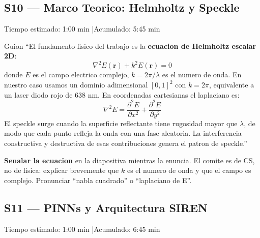 \vspace{8pt}

\subsection{S10 --- Marco Teorico: Helmholtz y Speckle}

\begin{timebox}
Tiempo estimado: 1:00 min \quad|\quad Acumulado: 5:45 min
\end{timebox}
\vspace{4pt}

\begin{slidebox}{Guion}
``El fundamento fisico del trabajo es la \textbf{ecuacion de Helmholtz escalar 2D}:
\[
  \nabla^2 E(\mathbf{r}) + k^2 E(\mathbf{r}) = 0
\]
donde $E$ es el campo electrico complejo, $k = 2\pi/\lambda$ es el numero de onda.
En nuestro caso usamos un dominio adimensional $[0,1]^2$ con $k = 2\pi$, equivalente
a un laser diodo rojo de 638 nm. En coordenadas cartesianas el laplaciano es:
\[
  \nabla^2 E = \frac{\partial^2 E}{\partial x^2} + \frac{\partial^2 E}{\partial y^2}
\]
El speckle surge cuando la superficie reflectante tiene rugosidad mayor que $\lambda$,
de modo que cada punto refleja la onda con una fase aleatoria. La interferencia
constructiva y destructiva de esas contribuciones genera el patron de speckle.''
\end{slidebox}
\vspace{4pt}

\begin{tipbox}
\textbf{Senalar la ecuacion} en la diapositiva mientras la enuncia. El comite es
de CS, no de fisica: explicar brevemente que $k$ es el numero de onda y que
el campo es complejo. Pronunciar ``nabla cuadrado'' o ``laplaciano de E''.
\end{tipbox}

\vspace{8pt}

\subsection{S11 --- PINNs y Arquitectura SIREN}

\begin{timebox}
Tiempo estimado: 1:00 min \quad|\quad Acumulado: 6:45 min
\end{timebox}
\vspace{4pt}

